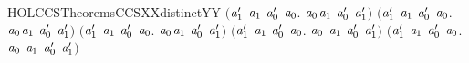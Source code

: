 \begin{SaveVerbatim}{HOLCCSTheoremsCCSXXdistinctYY}
   \ensuremath{(}\HOLSymConst{\HOLTokenForall{}}\ensuremath{\HOLBoundVar{a}\sb{\mathrm{1}}\sp{\prime}} \ensuremath{\HOLBoundVar{a}\sb{\mathrm{1}}} \ensuremath{\HOLBoundVar{a}\sb{\mathrm{0}}\sp{\prime}} \ensuremath{\HOLBoundVar{a}\sb{\mathrm{0}}}. \ensuremath{\HOLBoundVar{a}\sb{\mathrm{0}}}\HOLSymConst{\ensuremath{\ldotp}}\ensuremath{\HOLBoundVar{a}\sb{\mathrm{1}}} \HOLSymConst{\HOLTokenNotEqual{}}  \ensuremath{\HOLBoundVar{a}\sb{\mathrm{0}}\sp{\prime}} \ensuremath{\HOLBoundVar{a}\sb{\mathrm{1}}\sp{\prime}}\ensuremath{)} \HOLSymConst{\HOLTokenConj{}}
   \ensuremath{(}\HOLSymConst{\HOLTokenForall{}}\ensuremath{\HOLBoundVar{a}\sb{\mathrm{1}}\sp{\prime}} \ensuremath{\HOLBoundVar{a}\sb{\mathrm{1}}} \ensuremath{\HOLBoundVar{a}\sb{\mathrm{0}}\sp{\prime}} \ensuremath{\HOLBoundVar{a}\sb{\mathrm{0}}}. \ensuremath{\HOLBoundVar{a}\sb{\mathrm{0}}}\HOLSymConst{\ensuremath{\ldotp}}\ensuremath{\HOLBoundVar{a}\sb{\mathrm{1}}} \HOLSymConst{\HOLTokenNotEqual{}}  \ensuremath{\HOLBoundVar{a}\sb{\mathrm{0}}\sp{\prime}} \ensuremath{\HOLBoundVar{a}\sb{\mathrm{1}}\sp{\prime}}\ensuremath{)} \HOLSymConst{\HOLTokenConj{}}
   \ensuremath{(}\HOLSymConst{\HOLTokenForall{}}\ensuremath{\HOLBoundVar{a}\sb{\mathrm{1}}\sp{\prime}} \ensuremath{\HOLBoundVar{a}\sb{\mathrm{1}}} \ensuremath{\HOLBoundVar{a}\sb{\mathrm{0}}\sp{\prime}} \ensuremath{\HOLBoundVar{a}\sb{\mathrm{0}}}. \ensuremath{\HOLBoundVar{a}\sb{\mathrm{0}}}\HOLSymConst{\ensuremath{\ldotp}}\ensuremath{\HOLBoundVar{a}\sb{\mathrm{1}}} \HOLSymConst{\HOLTokenNotEqual{}}  \ensuremath{\HOLBoundVar{a}\sb{\mathrm{0}}\sp{\prime}} \ensuremath{\HOLBoundVar{a}\sb{\mathrm{1}}\sp{\prime}}\ensuremath{)} \HOLSymConst{\HOLTokenConj{}}
   \ensuremath{(}\HOLSymConst{\HOLTokenForall{}}\ensuremath{\HOLBoundVar{a}\sb{\mathrm{1}}\sp{\prime}} \ensuremath{\HOLBoundVar{a}\sb{\mathrm{1}}} \ensuremath{\HOLBoundVar{a}\sb{\mathrm{0}}\sp{\prime}} \ensuremath{\HOLBoundVar{a}\sb{\mathrm{0}}}. \ensuremath{\HOLBoundVar{a}\sb{\mathrm{0}}} \HOLSymConst{\ensuremath{+}} \ensuremath{\HOLBoundVar{a}\sb{\mathrm{1}}} \HOLSymConst{\HOLTokenNotEqual{}} \ensuremath{\HOLBoundVar{a}\sb{\mathrm{0}}\sp{\prime}} \HOLSymConst{\ensuremath{\mid}} \ensuremath{\HOLBoundVar{a}\sb{\mathrm{1}}\sp{\prime}}\ensuremath{)} \HOLSymConst{\HOLTokenConj{}}
   \ensuremath{(}\HOLSymConst{\HOLTokenForall{}}\ensuremath{\HOLBoundVar{a}\sb{\mathrm{1}}\sp{\prime}} \ensuremath{\HOLBoundVar{a}\sb{\mathrm{1}}} \ensuremath{\HOLBoundVar{a}\sb{\mathrm{0}}\sp{\prime}} \ensuremath{\HOLBoundVar{a}\sb{\mathrm{0}}}. \ensuremath{\HOLBoundVar{a}\sb{\mathrm{0}}} \HOLSymConst{\ensuremath{+}} \ensuremath{\HOLBoundVar{a}\sb{\mathrm{1}}} \HOLSymConst{\HOLTokenNotEqual{}}  \ensuremath{\HOLBoundVar{a}\sb{\mathrm{0}}\sp{\prime}} \ensuremath{\HOLBoundVar{a}\sb{\mathrm{1}}\sp{\prime}}\ensuremath{)} \HOLSymConst{\HOLTokenConj{}}

\end{SaveVerbatim}
